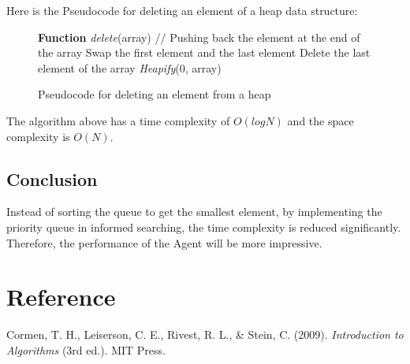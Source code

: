 \documentclass{assignment}
\begin{document}
Here is the Pseudocode for deleting an element of a heap data structure:
\begin{figure}[htbp]
    \centering
    \begin{mdframed}
      \begin{algorithmic}
    \STATE \textbf{Function} \textit{delete}(array)
	\STATE \hspace*{0.5cm} // Pushing back the element at the end of the array
	\STATE \hspace*{0.5cm} Swap the first element and the last element
	\STATE \hspace*{0.5cm} Delete the last element of the array
	\STATE \hspace*{0.5cm} \textit{Heapify}(0, array)
\end{algorithmic}
    \end{mdframed}
    \caption{Pseudocode for deleting an element from a heap}
    \label{fig:fig21}
 \end{figure}
 
 The algorithm above has a time complexity of $O(logN)$ and the space complexity is $O(N)$.
 
\subsection{Conclusion}
Instead of sorting the queue to get the smallest element, by implementing the priority queue in informed searching, the time complexity is reduced significantly. Therefore, the performance of the Agent will be more impressive. 

\section{Reference}
Cormen, T. H., Leiserson, C. E., Rivest, R. L., & Stein, C. (2009). \textit{Introduction to Algorithms} (3rd ed.). MIT Press.
\end{document}
